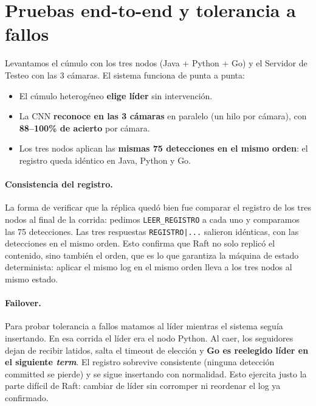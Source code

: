 \documentclass[11pt,a4paper]{article}
\begin{document}
\section{Pruebas end-to-end y tolerancia a fallos}\label{sec:e2e}
Levantamos el c\'umulo con los tres nodos (Java + Python + Go) y el Servidor de
Testeo con las 3 c\'amaras. El sistema funciona de punta a punta:

\begin{itemize}[nosep,leftmargin=1.4em]
  \item El c\'umulo heterog\'eneo \textbf{elige l\'ider} sin intervenci\'on.
  \item La CNN \textbf{reconoce en las 3 c\'amaras} en paralelo (un hilo por
        c\'amara), con \textbf{88--100\% de acierto} por c\'amara.
  \item Los tres nodos aplican las \textbf{mismas 75 detecciones en el mismo
        orden}: el registro queda id\'entico en Java, Python y Go.
\end{itemize}

\paragraph{Consistencia del registro.} La forma de verificar que la r\'eplica
qued\'o bien fue comparar el registro de los tres nodos al final de la corrida:
pedimos \texttt{LEER\_REGISTRO} a cada uno y comparamos las 75 detecciones. Las
tres respuestas \texttt{REGISTRO|...} salieron id\'enticas, con las detecciones
en el mismo orden. Esto confirma que Raft no solo replic\'o el contenido, sino
tambi\'en el orden, que es lo que garantiza la m\'aquina de estado
determinista: aplicar el mismo log en el mismo orden lleva a los tres nodos al
mismo estado.

\paragraph{Failover.} Para probar tolerancia a fallos matamos al l\'ider mientras
el sistema segu\'ia insertando. En esa corrida el l\'ider era el nodo Python. Al
caer, los seguidores dejan de recibir latidos, salta el timeout de elecci\'on y
\textbf{Go es reelegido l\'ider en el siguiente \emph{term}}. El registro
sobrevive consistente (ninguna detecci\'on committed se pierde) y se sigue
insertando con normalidad. Esto ejercita justo la parte dif\'icil de Raft: cambiar
de l\'ider sin corromper ni reordenar el log ya confirmado.
\end{document}
